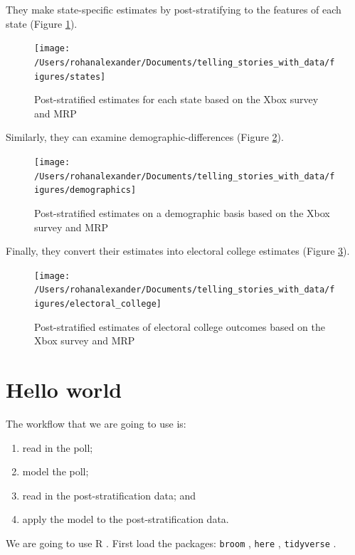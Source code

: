 \documentclass[
]{book}
\providecommand{\tightlist}{%
  \setlength{\itemsep}{0pt}\setlength{\parskip}{0pt}}
\begin{document}
They make state-specific estimates by post-stratifying to the features of each state (Figure \ref{fig:states}).

\begin{figure}
\texttt{[image: /Users/rohanalexander/Documents/telling\_stories\_with\_data/figures/states]} \caption{Post-stratified estimates for each state based on the Xbox survey and MRP}\label{fig:states}
\end{figure}

Similarly, they can examine demographic-differences (Figure \ref{fig:demographics}).

\begin{figure}
\texttt{[image: /Users/rohanalexander/Documents/telling\_stories\_with\_data/figures/demographics]} \caption{Post-stratified estimates on a demographic basis based on the Xbox survey and MRP}\label{fig:demographics}
\end{figure}

Finally, they convert their estimates into electoral college estimates (Figure \ref{fig:electoralcollege}).

\begin{figure}
\texttt{[image: /Users/rohanalexander/Documents/telling\_stories\_with\_data/figures/electoral\_college]} \caption{Post-stratified estimates of electoral college outcomes based on the Xbox survey and MRP}\label{fig:electoralcollege}
\end{figure}

\hypertarget{hello-world-1}{%
\section{Hello world}\label{hello-world-1}}

The workflow that we are going to use is:

\begin{enumerate}
\def\labelenumi{\arabic{enumi})}
\tightlist
\item
  read in the poll;
\item
  model the poll;
\item
  read in the post-stratification data; and
\item
  apply the model to the post-stratification data.
\end{enumerate}

We are going to use R \citep{citeR}. First load the packages: \texttt{broom} \citep{citebroom}, \texttt{here} \citep{citehere}, \texttt{tidyverse} \citep{citetidyverse}.
\end{document}
